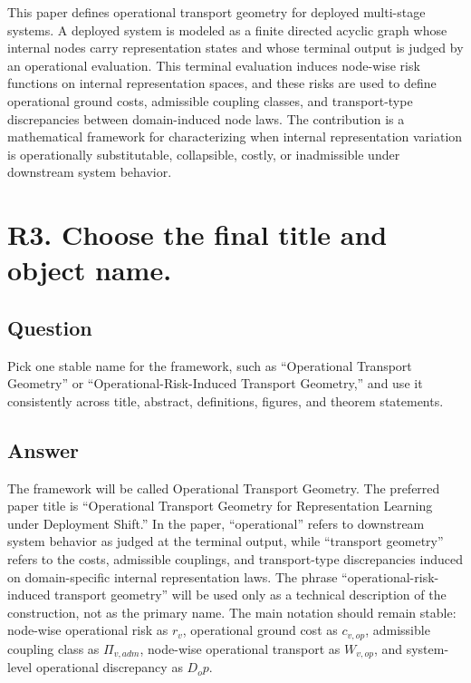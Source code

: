 \documentclass[11pt,a4paper]{article}
\begin{document}
This paper defines operational transport geometry for deployed multi-stage systems. A deployed system is modeled as a finite directed acyclic graph whose internal nodes carry representation states and whose terminal output is judged by an operational evaluation. This terminal evaluation induces node-wise risk functions on internal representation spaces, and these risks are used to define operational ground costs, admissible coupling classes, and transport-type discrepancies between domain-induced node laws. The contribution is a mathematical framework for characterizing when internal representation variation is operationally substitutable, collapsible, costly, or inadmissible under downstream system behavior.

\section*{R3. Choose the final title and object name.}

\subsection*{Question}

Pick one stable name for the framework, such as ``Operational Transport Geometry'' or ``Operational-Risk-Induced Transport Geometry,'' and use it consistently across title, abstract, definitions, figures, and theorem statements.

\subsection*{Answer}

The framework will be called Operational Transport Geometry. The preferred paper title is ``Operational Transport Geometry for Representation Learning under Deployment Shift.'' In the paper, ``operational'' refers to downstream system behavior as judged at the terminal output, while ``transport geometry'' refers to the costs, admissible couplings, and transport-type discrepancies induced on domain-specific internal representation laws. The phrase ``operational-risk-induced transport geometry'' will be used only as a technical description of the construction, not as the primary name. The main notation should remain stable: node-wise operational risk as \(r_v\), operational ground cost as \(c_{v,op}\), admissible coupling class as \(\Pi_{v,adm}\), node-wise operational transport as \(W_{v,op}\), and system-level operational discrepancy as \(D_op\).
\end{document}
